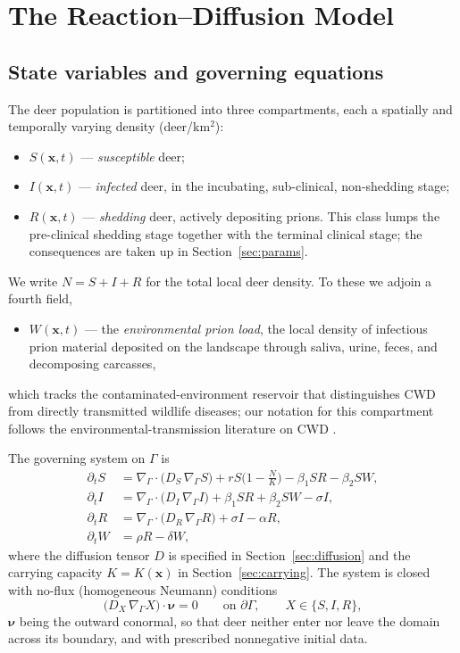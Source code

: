 \documentclass[11pt]{article}
\newcommand{\Grad}{\nabla_\Gamma}
\newcommand{\Div}{\nabla_\Gamma\cdot}
\begin{document}
\section{The Reaction--Diffusion Model}
\label{sec:model}

\subsection{State variables and governing equations}

The deer population is partitioned into three compartments, each a spatially and temporally varying density (deer/km$^2$):
\begin{itemize}
  \item $S(\mathbf{x},t)$ --- \emph{susceptible} deer;
  \item $I(\mathbf{x},t)$ --- \emph{infected} deer, in the incubating, sub-clinical, non-shedding stage;
  \item $R(\mathbf{x},t)$ --- \emph{shedding} deer, actively depositing prions. This class lumps the pre-clinical shedding stage together with the terminal clinical stage; the consequences are taken up in Section~\ref{sec:params}.
\end{itemize}
We write $N = S + I + R$ for the total local deer density. To these we adjoin a fourth field,
\begin{itemize}
  \item $W(\mathbf{x},t)$ --- the \emph{environmental prion load}, the local density of infectious prion material deposited on the landscape through saliva, urine, feces, and decomposing carcasses,
\end{itemize}
which tracks the contaminated-environment reservoir that distinguishes CWD from directly transmitted wildlife diseases; our notation for this compartment follows the environmental-transmission literature on CWD \citep{Almberg2011}.

The governing system on $\Gamma$ is
\begin{align}
  \partial_t S &= \Div\big(D_S\,\Grad S\big) + rS\Big(1-\frac{N}{K}\Big) - \beta_1 S R - \beta_2 S W, \label{eq:S} \\
  \partial_t I &= \Div\big(D_I\,\Grad I\big) + \beta_1 S R + \beta_2 S W - \sigma I, \label{eq:I} \\
  \partial_t R &= \Div\big(D_R\,\Grad R\big) + \sigma I - \alpha R, \label{eq:R} \\
  \partial_t W &= \rho R - \delta W, \label{eq:W}
\end{align}
where the diffusion tensor $D$ is specified in Section~\ref{sec:diffusion} and the carrying capacity $K = K(\mathbf{x})$ in Section~\ref{sec:carrying}. The system is closed with no-flux (homogeneous Neumann) conditions
\begin{equation}
  \big(D_X\,\Grad X\big)\cdot\boldsymbol{\nu} = 0
  \qquad \text{on } \partial\Gamma, \qquad X\in\{S,I,R\},
  \label{eq:bc}
\end{equation}
$\boldsymbol{\nu}$ being the outward conormal, so that deer neither enter nor leave the domain across its boundary, and with prescribed nonnegative initial data.
\end{document}
